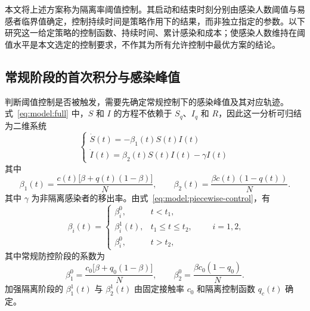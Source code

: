 \documentclass[UTF8,a4paper,10pt,fontset=fandol]{ctexart}
\theoremstyle{cnplain}
\theoremstyle{remark}
\numberwithin{equation}{section}
\begin{document}
本文将上述方案称为隔离率阈值控制。其启动和结束时刻分别由感染人数阈值与易感者临界值确定，控制持续时间是策略作用下的结果，而非独立指定的参数。以下研究这一给定策略的控制函数、持续时间、累计感染和成本；使感染人数维持在阈值水平是本文选定的控制要求，不作其为所有允许控制中最优方案的结论。

\subsection{常规阶段的首次积分与感染峰值}
判断阈值控制是否被触发，需要先确定常规控制下的感染峰值及其对应轨迹。式~\eqref{eq:model:full} 中，$S$ 和 $I$ 的方程不依赖于 $S_q$、$I_q$ 和 $R$，因此这一分析可归结为二维系统
\begin{equation}
\begin{cases}
\dot{S}(t) = - \beta_1(t) S(t) I(t) \\
\dot{I}(t) =   \beta_2(t) S(t) I(t) - \gamma I(t)
\end{cases}
\label{eq:model:reduced-si}
\end{equation}
其中
\begin{equation}
\beta_1(t)=\frac{c(t)\big[\beta+q(t)(1-\beta)\big]}{N},
\qquad
\beta_2(t)=\frac{\beta c(t)(1-q(t))}{N}.
\label{eq:model:beta12-general}
\end{equation}
其中 $\gamma$ 为非隔离感染者的移出率。由式~\eqref{eq:model:piecewise-control}，有
\begin{equation}
\beta_i(t)=
\begin{cases}
\beta_i^0, & t<t_1,\\
\beta_i^1(t), & t_1\le t\le t_2,\\
\beta_i^0, & t>t_2,
\end{cases}
\qquad i=1,2,
\end{equation}
其中常规防控阶段的系数为
\begin{equation}
\beta_1^0=\frac{c_0\big[\beta+q_0(1-\beta)\big]}{N},
\qquad
\beta_2^0=\frac{\beta c_0(1-q_0)}{N}.
\label{eq:model:beta12-baseline}
\end{equation}
加强隔离阶段的 $\beta_1^1(t)$ 与 $\beta_2^1(t)$ 由固定接触率 $c_0$ 和隔离控制函数 $q_c(t)$ 确定。
\end{document}
